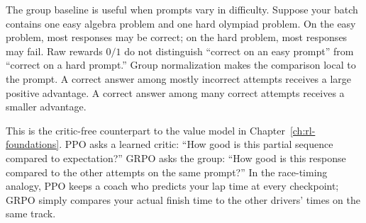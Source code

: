 The group baseline is useful when prompts vary in difficulty. Suppose your batch contains one easy algebra problem and one hard olympiad problem. On the easy problem, most responses may be correct; on the hard problem, most responses may fail. Raw rewards $0/1$ do not distinguish ``correct on an easy prompt'' from ``correct on a hard prompt.'' Group normalization makes the comparison local to the prompt. A correct answer among mostly incorrect attempts receives a large positive advantage. A correct answer among many correct attempts receives a smaller advantage.

This is the critic-free counterpart to the value model in Chapter~\ref{ch:rl-foundations}. PPO asks a learned critic: ``How good is this partial sequence compared to expectation?'' GRPO asks the group: ``How good is this response compared to the other attempts on the same prompt?'' In the race-timing analogy, PPO keeps a coach who predicts your lap time at every checkpoint; GRPO simply compares your actual finish time to the other drivers' times on the same track.

\noindent{}

